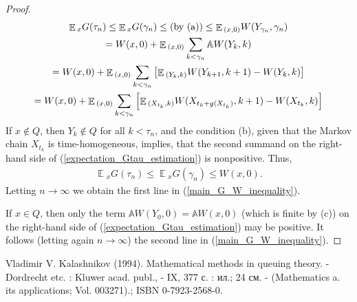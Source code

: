 \documentclass[10pt, reqno]{amsart}
\theoremstyle{definition}
\newcommand{\aasVar}{Q} %
\newcommand{\astVar}{\tau} %
\newcommand{\gtfVar}{G} %
\newcommand{\wtfVar}{W} %
\newcommand{\atoVar}{\mathbb{A}} %
\DeclareMathOperator*{\E}{\mathbb{E}}
\begin{document}
\begin{proof}
		\begin{gather}
			\E{}_{x}\gtfVar(\astVar_{n}) \leq \E{}_{x}\gtfVar(\gamma_{n}) \leq \text{(by (a))} \leq \E{}_{(x, 0)}\wtfVar(Y_{\gamma_{n}}, \gamma_{n}) \notag \notag\\ = \wtfVar(x, 0) + \E{}_{(x, 0)}\sum_{k < \gamma_{n}}\atoVar\wtfVar(Y_{k}, k) \notag\\ = \wtfVar(x, 0) + \E{}_{(x, 0)}\sum_{k < \gamma_{n}}\left[\E{}_{(Y_{k}, k)}\wtfVar(Y_{k+1}, k+1) - \wtfVar(Y_{k}, k)\right] \notag\\ = \wtfVar(x, 0) + \E{}_{(x, 0)}\sum_{k < \gamma_{n}}\left[\E{}_{(X_{t_{k}}, k)}\wtfVar(X_{t_{k} + \gffVar(X_{t_{k}})}, k+1) - \wtfVar(X_{t_{k}}, k)\right]
			\label{expectation_Gtau_estimation}
		\end{gather}
		If $x \notin \aasVar$, then $Y_{k} \notin \aasVar$ for all $k < \astVar_{n}$, and the condition (b), given that the Markov chain $X_{t_{k}}$ is time-homogeneous, implies, that the second summand on the right-hand side of (\ref{expectation_Gtau_estimation}) is nonpositive. Thus,
		\begin{gather*}
			\E{}_{x}\gtfVar(\astVar_{n}) \leq \E{}_{x}\gtfVar(\gamma_{n}) \leq \wtfVar(x, 0).
		\end{gather*}
		Letting $n \xrightarrow{} \infty$ we obtain the first line in (\ref{main_G_W_inequality}).
		
		If $x \in \aasVar$, then only the term $\atoVar\wtfVar(Y_{0}, 0) = \atoVar\wtfVar(x, 0)$ (which is finite by (c)) on the right-hand side of (\ref{expectation_Gtau_estimation}) may be positive. It follows (letting again $n \xrightarrow{} \infty$) the second line in (\ref{main_G_W_inequality}).
	\end{proof}
	
	\begin{thebibliography}{1}
		\bigskip
		\footnotesize
		Vladimir V. Kalashnikov (1994). Mathematical methods in queuing theory. - Dordrecht etc. : Kluwer acad. publ., - IX, 377 с. : ил.; 24 см. - (Mathematics a. its applications; Vol. 003271).; ISBN 0-7923-2568-0.
		
	\end{thebibliography}
\end{document}
